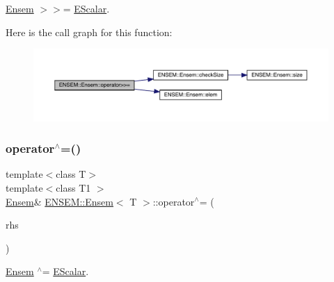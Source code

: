 \mbox{\hyperlink{classENSEM_1_1Ensem}{Ensem}} $>$$>$= \mbox{\hyperlink{classENSEM_1_1EScalar}{E\+Scalar}}. 

Here is the call graph for this function\+:
\nopagebreak
\begin{figure}[H]
\begin{center}
\leavevmode
\includegraphics[width=350pt]{d7/d3e/classENSEM_1_1Ensem_a9511b1d1b45de39920d451700eecd4d9_cgraph}
\end{center}
\end{figure}
\mbox{\label{classENSEM_1_1Ensem_a7f9a469a80ccb509892aef8d356fd81e}} 
\subsubsection{\texorpdfstring{operator$^\wedge$=()}{operator^=()}\hspace{0.1cm}{\footnotesize\ttfamily [1/2]}}
{\footnotesize\ttfamily template$<$class T$>$ \\
template$<$class T1 $>$ \\
\mbox{\hyperlink{classENSEM_1_1Ensem}{Ensem}}\& \mbox{\hyperlink{classENSEM_1_1Ensem}{E\+N\+S\+E\+M\+::\+Ensem}}$<$ T $>$\+::operator$^\wedge$= (\begin{DoxyParamCaption}\item[{const \mbox{\hyperlink{classENSEM_1_1EScalar}{E\+Scalar}}$<$ T1 $>$ \&}]{rhs }\end{DoxyParamCaption})\hspace{0.3cm}{\ttfamily [inline]}}



\mbox{\hyperlink{classENSEM_1_1Ensem}{Ensem}} $^\wedge$= \mbox{\hyperlink{classENSEM_1_1EScalar}{E\+Scalar}}. 

